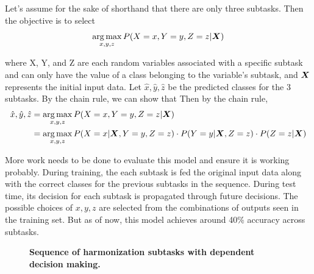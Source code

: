 \documentclass[11pt]{article}
\begin{document}
Let's assume for the sake of shorthand that there are only three subtasks. Then the objective is to select
$$\argmax_{x, y, z} P(X=x, Y=y, Z=z | \boldX)$$ 

where X, Y, and Z are each random variables associated with a specific subtask and can only have the value of a class belonging to the variable's subtask, and $\boldsymbol{X}$ represents the initial input data. Let $\hat{x}, \hat{y}, \hat{z}$ be the predicted classes for the 3 subtasks. By the chain rule, we can show that Then by the chain rule,
\begin{align*}
\hat{x}, \hat{y}, \hat{z} &= \argmax_{x, y, z} P(X=x, Y=y, Z=z | \boldX) \\
				  &= \argmax_{x,y,z} P(X=x | \boldX, Y=y, Z=z) \cdot P(Y=y | \boldX, Z=z) \cdot P(Z=z | \boldX)
\end{align*}

More work needs to be done to evaluate this model and ensure it is working probably. During training, the each subtask is fed the original input data along with the correct classes for the previous subtasks in the sequence. During test time, its decision for each subtask is propagated through future decisions. The possible choices of $x,y,z$ are selected from the combinations of outputs seen in the training set. But as of now, this model achieves around 40\% accuracy across subtasks.

\begin{figure}[h]
\begin{center}
\caption{\textbf{Sequence of harmonization subtasks with dependent decision making.}}
\end{center}
\end{figure}
\end{document}
